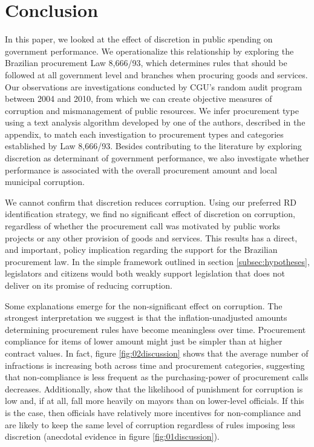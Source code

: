 \documentclass[11pt]{article}
\begin{document}
\section{Conclusion} \label{sec:conclusion}

In this paper, we looked at the effect of discretion in public spending on government performance. We operationalize this relationship by exploring the Brazilian procurement Law 8,666/93, which determines rules that should be followed at all government level and branches when procuring goods and services. Our observations are investigations conducted by CGU's random audit program between 2004 and 2010, from which we can create objective measures of corruption and mismanagement of public resources. We infer procurement type using a text analysis algorithm developed by one of the authors, described in the appendix, to match each investigation to procurement types and categories established by Law 8,666/93. Besides contributing to the literature by exploring discretion as determinant of government performance, we also investigate whether performance is associated with the overall procurement amount and local municipal corruption.

We cannot confirm that discretion reduces corruption. Using our preferred RD identification strategy, we find no significant effect of discretion on corruption, regardless of whether the procurement call was motivated by public works projects or any other provision of goods and services. This results has a direct, and important, policy implication regarding the support for the Brazilian procurement law. In the simple framework outlined in section \ref{subsec:hypotheses}, legislators and citizens would both weakly support legislation that does not deliver on its promise of reducing corruption.

Some explanations emerge for the non-significant effect on corruption. The strongest interpretation we suggest is that the inflation-unadjusted amounts determining procurement rules have become meaningless over time. Procurement compliance for items of lower amount might just be simpler than at higher contract values. In fact, figure \ref{fig:02discussion} shows that the average number of infractions is increasing both across time and procurement categories, suggesting that non-compliance is less frequent as the purchasing-power of procurement calls decreases. Additionally, \citet{AvisGovernmentAuditsReduce2018} show that the likelihood of punishment for corruption is low and, if at all, fall more heavily on mayors than on lower-level officials. If this is the case, then officials have relatively more incentives for non-compliance and are likely to keep the same level of corruption regardless of rules imposing less discretion (anecdotal evidence in figure \ref{fig:01discussion}).
\end{document}
